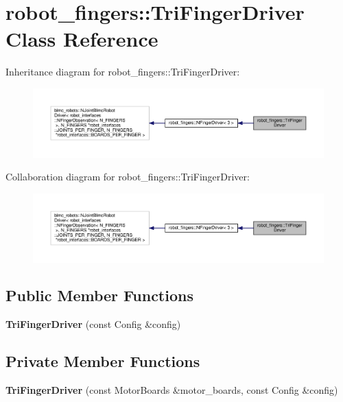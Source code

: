 \hypertarget{classrobot__fingers_1_1TriFingerDriver}{}\section{robot\+\_\+fingers\+:\+:Tri\+Finger\+Driver Class Reference}
\label{classrobot__fingers_1_1TriFingerDriver}


Inheritance diagram for robot\+\_\+fingers\+:\+:Tri\+Finger\+Driver\+:
\nopagebreak
\begin{figure}[H]
\begin{center}
\leavevmode
\includegraphics[width=350pt]{classrobot__fingers_1_1TriFingerDriver__inherit__graph}
\end{center}
\end{figure}


Collaboration diagram for robot\+\_\+fingers\+:\+:Tri\+Finger\+Driver\+:
\nopagebreak
\begin{figure}[H]
\begin{center}
\leavevmode
\includegraphics[width=350pt]{classrobot__fingers_1_1TriFingerDriver__coll__graph}
\end{center}
\end{figure}
\subsection*{Public Member Functions}
\begin{DoxyCompactItemize}
\item 
\mbox{\label{classrobot__fingers_1_1TriFingerDriver_a6fa7ba8449fcf922f7d87fea296c9eca}} 
{\bfseries Tri\+Finger\+Driver} (const Config \&config)
\end{DoxyCompactItemize}
\subsection*{Private Member Functions}
\begin{DoxyCompactItemize}
\item 
\mbox{\label{classrobot__fingers_1_1TriFingerDriver_aa476efb16c779276941ff1ba6da6c28a}} 
{\bfseries Tri\+Finger\+Driver} (const Motor\+Boards \&motor\+\_\+boards, const Config \&config)
\end{DoxyCompactItemize}
